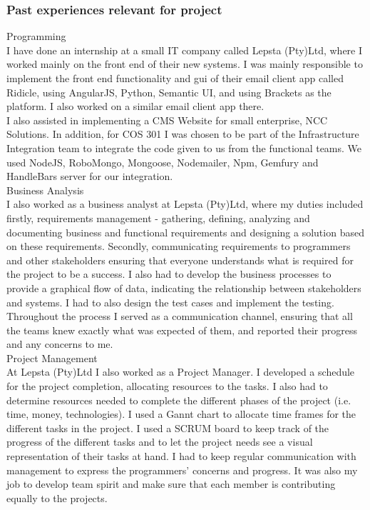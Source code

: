 \documentclass[hidelinks, 12pt, oneside]{article}
\begin{document}
\subsubsection{Past experiences relevant for project}
Programming \\
I have done an internship at a small IT company called Lepsta (Pty)Ltd, where I worked mainly on the front end of their new systems. I was mainly responsible to implement the front end functionality and gui of their email client app called Ridicle, using AngularJS, Python, Semantic UI, and using Brackets as the platform. I also worked on a similar email client app there.\\

I also assisted in implementing a CMS Website for small enterprise, NCC Solutions. In addition, for COS 301 I was chosen to be part of the Infrastructure Integration team to integrate the code given to us from the functional teams. We used NodeJS, RoboMongo, Mongoose, Nodemailer, Npm, Gemfury and HandleBars server for our integration. \\

Business Analysis \\
I also worked as a business analyst at Lepsta (Pty)Ltd, where my duties included firstly, requirements management - gathering, defining, analyzing and documenting business and functional requirements and designing a solution based on these requirements. Secondly, communicating requirements to programmers and other stakeholders ensuring that everyone understands what is required for the project to be a success. I also had to develop the business processes to provide a graphical flow of data, indicating the relationship between stakeholders and systems. I had to also design the test cases and implement the testing. Throughout the process I served as a communication channel, ensuring that all the teams knew exactly what was expected of them, and reported their progress and any concerns to me.\\

Project Management \\
At Lepsta (Pty)Ltd I also worked as a Project Manager. I developed a schedule for the project completion, allocating resources to the tasks. I also had to determine resources needed to complete the different phases of the project (i.e. time, money, technologies). I used a Gannt chart to allocate time frames for the different tasks in the project. I used a SCRUM board to keep track of the progress of the different tasks and to let the project needs see a visual representation of their tasks at hand. I had to keep regular communication with management to express the programmers' concerns and progress. It was also my job to develop team spirit and make sure that each member is contributing equally to the projects. \\
 
\end{document}
